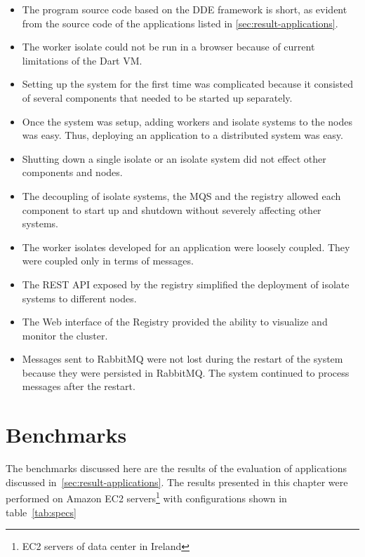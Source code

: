 \begin{itemize}
  \item The program source code based on the DDE framework is short, as evident from the source code of the applications listed in \autoref{sec:result-applications}.

  \item The worker isolate could not be run in a browser because of current limitations of the Dart VM.

  \item Setting up the system for the first time was complicated because it consisted of several components that needed to be started up separately.

  \item Once the system was setup, adding workers and isolate systems to the nodes was easy. Thus, deploying an application to a distributed system was easy.

  \item Shutting down a single isolate or an isolate system did not effect other components and nodes.

  \item The decoupling of isolate systems, the MQS and the registry allowed each component to start up and shutdown without severely affecting other systems.

  \item The worker isolates developed for an application were loosely coupled. They were coupled only in terms of messages.

  \item The REST API exposed by the registry simplified the deployment of isolate systems to different nodes.

  \item The Web interface of the Registry provided the ability to visualize and monitor the cluster.

  \item Messages sent to RabbitMQ were not lost during the restart of the system because they were persisted in RabbitMQ. The system continued to process messages after the restart.
\end{itemize}

\section{Benchmarks}
\label{sec:benchmarks}
  The benchmarks discussed here are the results of the evaluation of applications discussed in~\autoref{sec:result-applications}. The results presented in this chapter were performed on Amazon EC2 servers\footnote{EC2 servers of data center in Ireland} with configurations shown in table~\autoref{tab:specs}

